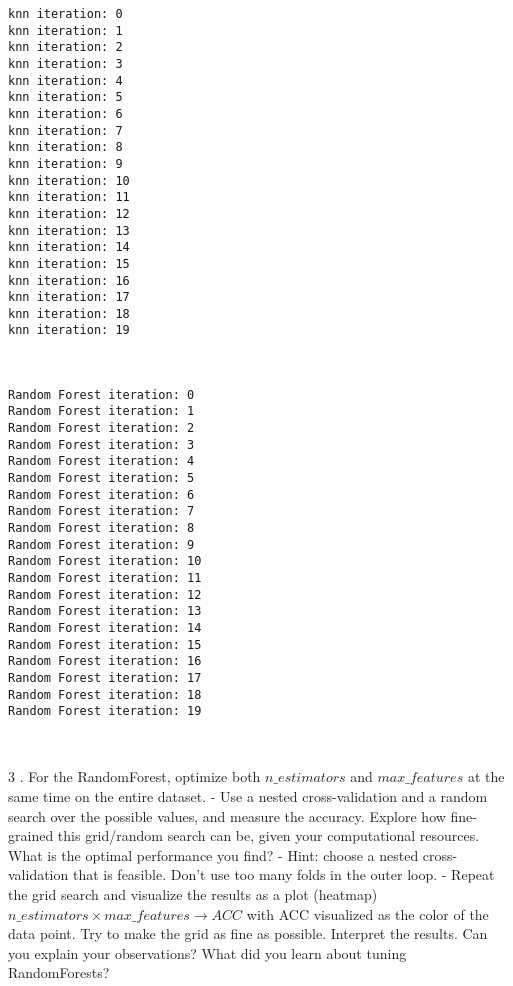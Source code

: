 \documentclass[11pt]{article}
\begin{document}
    \begin{Verbatim}[commandchars=\\\{\}]
knn iteration: 0 
knn iteration: 1 
knn iteration: 2 
knn iteration: 3 
knn iteration: 4 
knn iteration: 5 
knn iteration: 6 
knn iteration: 7 
knn iteration: 8 
knn iteration: 9 
knn iteration: 10 
knn iteration: 11 
knn iteration: 12 
knn iteration: 13 
knn iteration: 14 
knn iteration: 15 
knn iteration: 16 
knn iteration: 17 
knn iteration: 18 
knn iteration: 19 

    \end{Verbatim}

    \begin{center}
    \end{center}
    { \hspace*{\fill} \\}
    
    \begin{Verbatim}[commandchars=\\\{\}]
Random Forest iteration: 0 
Random Forest iteration: 1 
Random Forest iteration: 2 
Random Forest iteration: 3 
Random Forest iteration: 4 
Random Forest iteration: 5 
Random Forest iteration: 6 
Random Forest iteration: 7 
Random Forest iteration: 8 
Random Forest iteration: 9 
Random Forest iteration: 10 
Random Forest iteration: 11 
Random Forest iteration: 12 
Random Forest iteration: 13 
Random Forest iteration: 14 
Random Forest iteration: 15 
Random Forest iteration: 16 
Random Forest iteration: 17 
Random Forest iteration: 18 
Random Forest iteration: 19 

    \end{Verbatim}

    \begin{center}
    \end{center}
    { \hspace*{\fill} \\}
    
    3 . For the RandomForest, optimize both \(n\_estimators\) and
\(max\_features\) at the same time on the entire dataset. - Use a nested
cross-validation and a random search over the possible values, and
measure the accuracy. Explore how fine-grained this grid/random search
can be, given your computational resources. What is the optimal
performance you find? - Hint: choose a nested cross-validation that is
feasible. Don't use too many folds in the outer loop. - Repeat the grid
search and visualize the results as a plot (heatmap)
\(n\_estimators \times max\_features \rightarrow ACC\) with ACC
visualized as the color of the data point. Try to make the grid as fine
as possible. Interpret the results. Can you explain your observations?
What did you learn about tuning RandomForests?
\end{document}

